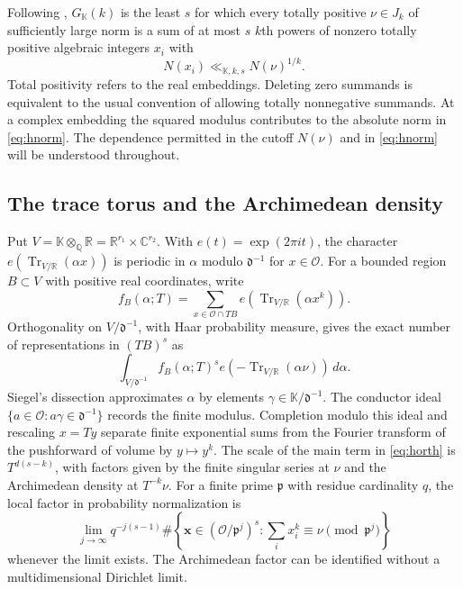 \documentclass[11pt,letterpaper]{article}
\theoremstyle{definition}
\numberwithin{equation}{section}
\begin{document}
Following \cite{hdav99}, $G_{\mathbb K}(k)$ is the least $s$ for which
every totally positive $\nu\in J_k$ of sufficiently large norm is a sum
of at most $s$ $k$th powers of nonzero totally positive algebraic integers
$x_i$ with
\begin{equation}\label{eq:hnorm}
                   N(x_i)\ll_{\mathbb K,k,s}N(\nu)^{1/k}.
\end{equation}
Total positivity refers to the real embeddings. Deleting zero summands
is equivalent to the usual convention of allowing totally nonnegative
summands. At a complex embedding the squared modulus contributes to the
absolute norm in \eqref{eq:hnorm}. The dependence permitted in the cutoff
$N(\nu)$ and in \eqref{eq:hnorm} will be understood throughout.

\subsection{The trace torus and the Archimedean density}
Put $V=\mathbb K\otimes_{\mathbb Q}\mathbb R=
\mathbb R^{r_1}\times\mathbb C^{r_2}$.
With $e(t)=\exp(2\pi i t)$, the character
$e(\operatorname{Tr}_{V/\mathbb R}(\alpha x))$ is periodic in $\alpha$
modulo $\mathfrak d^{-1}$ for $x\in\mathcal O$. For a bounded region
$B\subset V$ with positive real coordinates, write
\[
 f_B(\alpha;T)=\sum_{x\in\mathcal O\cap TB}
               e(\operatorname{Tr}_{V/\mathbb R}(\alpha x^k)).
\]
Orthogonality on $V/\mathfrak d^{-1}$, with Haar probability measure,
gives the exact number of representations in $(TB)^s$ as
\begin{equation}\label{eq:horth}
 \int_{V/\mathfrak d^{-1}} f_B(\alpha;T)^s
                 e(-\operatorname{Tr}_{V/\mathbb R}(\alpha\nu))\,d\alpha .
\end{equation}
Siegel's dissection \cite{hsieg44,hsieg45} approximates $\alpha$ by
elements $\gamma\in\mathbb K/\mathfrak d^{-1}$. The conductor ideal
$\{a\in\mathcal O:a\gamma\in\mathfrak d^{-1}\}$ records the finite
modulus. Completion modulo this ideal and rescaling $x=Ty$ separate
finite exponential sums from the Fourier transform of the pushforward
of volume by $y\mapsto y^k$. The scale of the main term in
\eqref{eq:horth} is $T^{d(s-k)}$, with factors given by the finite singular
series at $\nu$ and the Archimedean density at $T^{-k}\nu$.
For a finite prime $\mathfrak p$ with residue cardinality $q$, the
local factor in probability normalization is
\[
 \lim_{j\to\infty} q^{-j(s-1)}
 \#\left\{\mathbf x\in(\mathcal O/\mathfrak p^j)^s:
        \sum_i x_i^k\equiv\nu\pmod{\mathfrak p^j}\right\}
\]
whenever the limit exists. The Archimedean factor can be identified
without a multidimensional Dirichlet limit.
\end{document}

